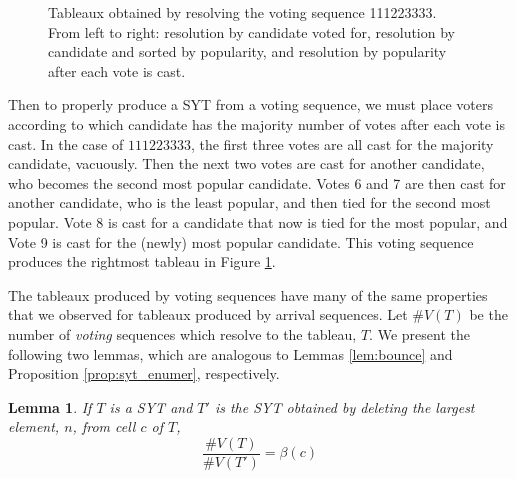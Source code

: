 \documentclass[article]{amsart}
\theoremstyle{plain}
\newtheorem{lemma}[proposition]{Lemma}
\theoremstyle{definition}
\begin{document}
\begin{figure}[h!]
\caption{Tableaux obtained by resolving the voting sequence 111223333. From left to right: resolution by candidate voted for, resolution by candidate and sorted by popularity, and resolution by popularity after each vote is cast. }
\label{fig:voting_syt} 
\end{figure}

Then to properly produce a SYT from a voting sequence, we must place voters according to which candidate has the majority number of votes after each vote is cast. In the case of $111223333$, the first three votes are all cast for the majority candidate, vacuously. Then the next two votes are cast for another candidate, who becomes the second most popular candidate. Votes 6 and 7 are then cast for another candidate, who is the least popular, and then tied for the second most popular. Vote 8 is cast for a candidate that now is tied for the most popular, and Vote 9 is cast for the (newly) most popular candidate. This voting sequence produces the rightmost tableau in Figure \ref{fig:voting_syt}.

The tableaux produced by voting sequences have many of the same properties that we observed for tableaux produced by arrival sequences. Let $\#V(T)$ be the number of \textit{voting} sequences which resolve to the tableau, $T$. We present the following two lemmas, which are analogous to Lemmas \ref{lem:bounce} and Proposition \ref{prop:syt_enumer}, respectively.

\begin{lemma} \label{lem:voting_bounce}
If $T$ is a SYT and $T'$ is the SYT obtained by deleting the largest element, $n$, from cell $c$ of $T$,
\[ \frac{\#V(T)}{\#V(T')} = \beta(c)\]
\end{lemma}
\end{document}
